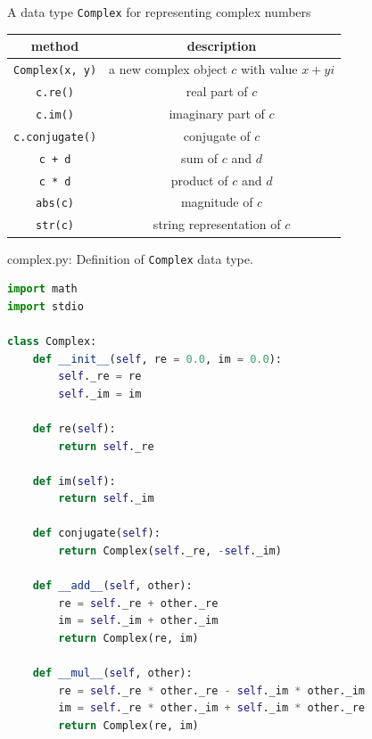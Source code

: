 \documentclass[8pt,a4paper,compress]{beamer}
\begin{document}
\begin{frame}[fragile]
A data type \lstinline{Complex} for representing complex numbers
\begin{center}
\begin{tabular}{cc}
method & description \\ \hline
\lstinline$Complex(x, y)$ & a new complex object $c$ with value $x + yi$ \\
\lstinline$c.re()$ & real part of $c$ \\
\lstinline$c.im()$ & imaginary part of $c$ \\
\lstinline$c.conjugate()$ & conjugate of $c$ \\
\lstinline$c + d$ & sum of $c$ and $d$ \\
\lstinline$c * d$ & product of $c$ and $d$ \\
\lstinline$abs(c)$ & magnitude of $c$ \\
\lstinline$str(c)$ & string representation of $c$
\end{tabular} 
\end{center}
\end{frame}

\begin{frame}[fragile]
\pause

\begin{framed}
\tiny complex.py: Definition of \lstinline{Complex} data type.
\end{framed}

\begin{lstlisting}[language=python,style=focusin]
import math
import stdio

class Complex:
    def __init__(self, re = 0.0, im = 0.0):
        self._re = re
        self._im = im

    def re(self):
        return self._re

    def im(self):
        return self._im

    def conjugate(self):
        return Complex(self._re, -self._im)

    def __add__(self, other):
        re = self._re + other._re
        im = self._im + other._im
        return Complex(re, im)

    def __mul__(self, other):
        re = self._re * other._re - self._im * other._im
        im = self._re * other._im + self._im * other._re
        return Complex(re, im)
\end{lstlisting}
\end{frame}
\end{document}
